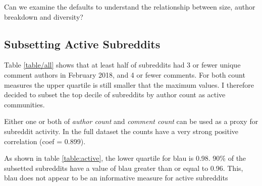 \documentclass{article}
\begin{document}
Can we examine the defaults to understand the relationship between size, author breakdown and diversity?



\subsection{Subsetting Active Subreddits}
Table \ref{table/all} shows that at least half of subreddits had 3 or fewer unique comment authors in February 2018, and 4 or fewer comments. For both count measures the upper quartile is still smaller that the maximum values. I therefore decided to subset the top decile of subreddits by author count as active communities.

Either one or both of \textit{author count} and \textit{comment count} can be used as a proxy for subreddit activity. In the full dataset the counts have a very strong positive correlation (coef = 0.899). 

As shown in table \ref{table:active}, the lower quartile for blau is 0.98. 90\% of the subsetted subreddits have a value of blau greater than or equal to 0.96.  This, blau does not appear to be an informative measure for active subreddits





\end{document}
